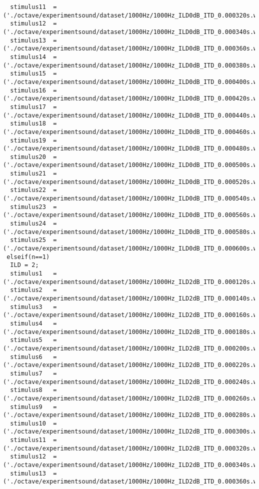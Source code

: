 {\begin{verbatim}
  stimulus11  =('./octave/experimentsound/dataset/1000Hz/1000Hz_ILD0dB_ITD_0.000320s.wav');
  stimulus12  =('./octave/experimentsound/dataset/1000Hz/1000Hz_ILD0dB_ITD_0.000340s.wav');
  stimulus13  =('./octave/experimentsound/dataset/1000Hz/1000Hz_ILD0dB_ITD_0.000360s.wav');
  stimulus14  =('./octave/experimentsound/dataset/1000Hz/1000Hz_ILD0dB_ITD_0.000380s.wav');
  stimulus15  =('./octave/experimentsound/dataset/1000Hz/1000Hz_ILD0dB_ITD_0.000400s.wav');
  stimulus16  =('./octave/experimentsound/dataset/1000Hz/1000Hz_ILD0dB_ITD_0.000420s.wav');
  stimulus17  =('./octave/experimentsound/dataset/1000Hz/1000Hz_ILD0dB_ITD_0.000440s.wav');
  stimulus18  =('./octave/experimentsound/dataset/1000Hz/1000Hz_ILD0dB_ITD_0.000460s.wav');
  stimulus19  =('./octave/experimentsound/dataset/1000Hz/1000Hz_ILD0dB_ITD_0.000480s.wav');
  stimulus20  =('./octave/experimentsound/dataset/1000Hz/1000Hz_ILD0dB_ITD_0.000500s.wav');
  stimulus21  =('./octave/experimentsound/dataset/1000Hz/1000Hz_ILD0dB_ITD_0.000520s.wav');
  stimulus22  =('./octave/experimentsound/dataset/1000Hz/1000Hz_ILD0dB_ITD_0.000540s.wav');
  stimulus23  =('./octave/experimentsound/dataset/1000Hz/1000Hz_ILD0dB_ITD_0.000560s.wav');
  stimulus24  =('./octave/experimentsound/dataset/1000Hz/1000Hz_ILD0dB_ITD_0.000580s.wav');
  stimulus25  =('./octave/experimentsound/dataset/1000Hz/1000Hz_ILD0dB_ITD_0.000600s.wav');
 elseif(n==1)
  ILD = 2;
  stimulus1   =('./octave/experimentsound/dataset/1000Hz/1000Hz_ILD2dB_ITD_0.000120s.wav');
  stimulus2   =('./octave/experimentsound/dataset/1000Hz/1000Hz_ILD2dB_ITD_0.000140s.wav');
  stimulus3   =('./octave/experimentsound/dataset/1000Hz/1000Hz_ILD2dB_ITD_0.000160s.wav');
  stimulus4   =('./octave/experimentsound/dataset/1000Hz/1000Hz_ILD2dB_ITD_0.000180s.wav');
  stimulus5   =('./octave/experimentsound/dataset/1000Hz/1000Hz_ILD2dB_ITD_0.000200s.wav');
  stimulus6   =('./octave/experimentsound/dataset/1000Hz/1000Hz_ILD2dB_ITD_0.000220s.wav');
  stimulus7   =('./octave/experimentsound/dataset/1000Hz/1000Hz_ILD2dB_ITD_0.000240s.wav');
  stimulus8   =('./octave/experimentsound/dataset/1000Hz/1000Hz_ILD2dB_ITD_0.000260s.wav');
  stimulus9   =('./octave/experimentsound/dataset/1000Hz/1000Hz_ILD2dB_ITD_0.000280s.wav');
  stimulus10  =('./octave/experimentsound/dataset/1000Hz/1000Hz_ILD2dB_ITD_0.000300s.wav');
  stimulus11  =('./octave/experimentsound/dataset/1000Hz/1000Hz_ILD2dB_ITD_0.000320s.wav');
  stimulus12  =('./octave/experimentsound/dataset/1000Hz/1000Hz_ILD2dB_ITD_0.000340s.wav');
  stimulus13  =('./octave/experimentsound/dataset/1000Hz/1000Hz_ILD2dB_ITD_0.000360s.wav');

\end{verbatim}}
